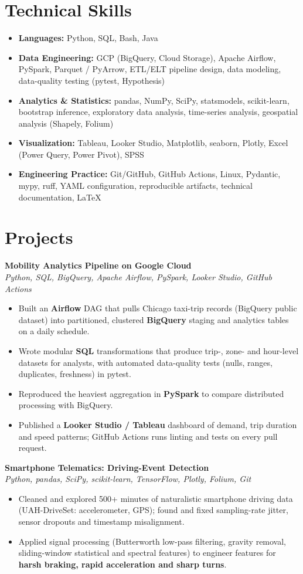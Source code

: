 \documentclass[10pt,letterpaper]{article}
\newcommand{\project}[2]{\textbf{#1}\\\textit{#2}\par}
\begin{document}
\section*{Technical Skills}
\begin{itemize}\item \textbf{Languages:} Python, SQL, Bash, Java\item \textbf{Data Engineering:} GCP (BigQuery, Cloud Storage), Apache Airflow, PySpark, Parquet / PyArrow, ETL/ELT pipeline design, data modeling, data-quality testing (pytest, Hypothesis)\item \textbf{Analytics \& Statistics:} pandas, NumPy, SciPy, statsmodels, scikit-learn, bootstrap inference, exploratory data analysis, time-series analysis, geospatial analysis (Shapely, Folium)\item \textbf{Visualization:} Tableau, Looker Studio, Matplotlib, seaborn, Plotly, Excel (Power Query, Power Pivot), SPSS\item \textbf{Engineering Practice:} Git/GitHub, GitHub Actions, Linux, Pydantic, mypy, ruff, YAML configuration, reproducible artifacts, technical documentation, LaTeX\end{itemize}
\section*{Projects}
\project{Mobility Analytics Pipeline on Google Cloud}{Python, SQL, BigQuery, Apache Airflow, PySpark, Looker Studio, GitHub Actions}
\begin{itemize}\item Built an \textbf{Airflow} DAG that pulls Chicago taxi-trip records (BigQuery public dataset) into partitioned, clustered \textbf{BigQuery} staging and analytics tables on a daily schedule.\item Wrote modular \textbf{SQL} transformations that produce trip-, zone- and hour-level datasets for analysts, with automated data-quality tests (nulls, ranges, duplicates, freshness) in pytest.\item Reproduced the heaviest aggregation in \textbf{PySpark} to compare distributed processing with BigQuery.\item Published a \textbf{Looker Studio / Tableau} dashboard of demand, trip duration and speed patterns; GitHub Actions runs linting and tests on every pull request.\end{itemize}\vspace{2pt}
\project{Smartphone Telematics: Driving-Event Detection}{Python, pandas, SciPy, scikit-learn, TensorFlow, Plotly, Folium, Git}
\begin{itemize}\item Cleaned and explored 500+ minutes of naturalistic smartphone driving data (UAH-DriveSet: accelerometer, GPS); found and fixed sampling-rate jitter, sensor dropouts and timestamp misalignment.\item Applied signal processing (Butterworth low-pass filtering, gravity removal, sliding-window statistical and spectral features) to engineer features for \textbf{harsh braking, rapid acceleration and sharp turns}.\end{itemize}\vspace{2pt}
\end{document}
